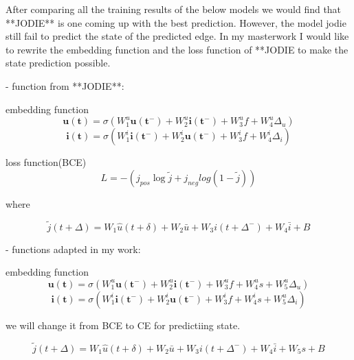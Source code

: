 After comparing all the training results of the below models we would find that **JODIE** is one coming up with the best prediction. However, the model jodie still fail to predict the state of the predicted edge.
In my masterwork I would like to rewrite the embedding function and the loss function of **JODIE to make the state prediction possible.

- function from **JODIE**:

embedding function
$$ \mathbf{u(t)}=\sigma(W_1^u\mathbf{u(t^-)}+W_2^u\mathbf{i(t^-)}+W_3^uf+W^u_4 \Delta _u)$$
$$ \mathbf{i(t)}=\sigma(W_1^i\mathbf{i(t^-)}+W_2^i\mathbf{u(t^-)}+W_3^if+W^i_4 \Delta _i)$$

loss function(BCE)
$$L=-(j_{pos}\log{\tilde{j}}+j_{neg}log(1-\tilde{j}))$$

where

$$\tilde{j}(t+\Delta)=W_1\hat{u}(t+\delta)+W_2\bar{u}+W_3i(t+\Delta ^-)+W_4\bar{i}+B$$



- functions adapted in my work:

embedding function
$$ \mathbf{u(t)}=\sigma(W_1^u\mathbf{u(t^-)}+W_2^u\mathbf{i(t^-)}+W_3^uf+W^u_4s+W^u_5\Delta _u)$$
$$ \mathbf{i(t)}=\sigma(W_1^i\mathbf{i(t^-)}+W_2^i\mathbf{u(t^-)}+W_3^if+W^i_4s+W^u_5 \Delta _i)$$

we will change it from BCE to CE for predictiing state.

$$\tilde{j}(t+\Delta)=W_1\hat{u}(t+\delta)+W_2\bar{u}+W_3i(t+\Delta ^-)+W_4\bar{i}+W_5s+B$$
